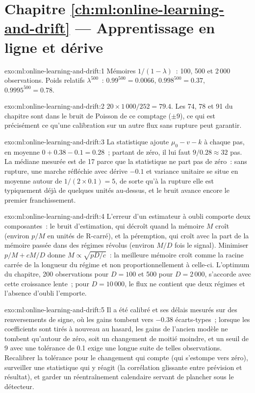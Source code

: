\section*{Chapitre \ref{ch:ml:online-learning-and-drift} --- Apprentissage en ligne et dérive}

\begin{solution}{exo:ml:online-learning-and-drift:1}
Mémoires $1/(1-\lambda)$~: 100, 500 et 2\,000 observations. Poids relatifs $\lambda^{500}$~: $0.99^{500} = 0.0066$,
$0.998^{500} = 0.37$, $0.9995^{500} = 0.78$.
\end{solution}

\begin{solution}{exo:ml:online-learning-and-drift:2}
$20\times1\,000/252 = 79.4$. Les 74, 78 et 91 du chapitre sont dans le bruit de Poisson de ce comptage ($\pm9$), ce qui est
précisément ce qu'une calibration sur un autre flux sans rupture peut garantir.
\end{solution}

\begin{solution}{exo:ml:online-learning-and-drift:3}
La statistique ajoute $\mu_0 - v - k$ à chaque pas, en moyenne $0 + 0.38 - 0.1 = 0.28$~; partant de zéro, il lui faut $9/0.28\approx32$
pas. La médiane mesurée est de 17 parce que la statistique ne part pas de zéro~: sans rupture, une marche réfléchie avec
dérive $-0.1$ et variance unitaire se situe en moyenne autour de $1/(2\times0.1) = 5$, de sorte qu'à la rupture elle est typiquement déjà de quelques unités
au-dessus, et le bruit avance encore le premier franchissement.
\end{solution}

\begin{solution}{exo:ml:online-learning-and-drift:4}
L'erreur d'un estimateur à oubli comporte deux composantes~: le bruit d'estimation, qui décroît quand la mémoire $M$ croît (environ $p/M$ en
unités de R-carré), et la péremption, qui croît avec la part de la mémoire passée dans des régimes révolus (environ $M/D$ fois le
signal). Minimiser $p/M + cM/D$ donne $M\propto\sqrt{pD/c}$~: la meilleure mémoire croît comme la racine carrée de la longueur du régime
et non proportionnellement à celle-ci. L'optimum du chapitre, 200 observations pour $D = 100$ et 500 pour $D = 2\,000$, s'accorde avec cette
croissance lente~; pour $D = 10\,000$, le flux ne contient que deux régimes et l'absence d'oubli l'emporte.
\end{solution}

\begin{solution}{exo:ml:online-learning-and-drift:5}
Il a été calibré et ses délais mesurés sur des renversements de signe, où les gains tombent vers $-0.38$ écarts-types~; lorsque les
coefficients sont tirés à nouveau au hasard, les gains de l'ancien modèle ne tombent qu'autour de zéro, soit un changement de moitié moindre, et un
seuil de 9 avec une tolérance de 0.1 exige une longue suite de telles observations. Recalibrer la tolérance pour le changement qui compte
(qui s'estompe vers zéro), surveiller une statistique qui y réagit (la corrélation glissante entre prévision et résultat), et garder un
réentraînement calendaire servant de plancher sous le détecteur.
\end{solution}

